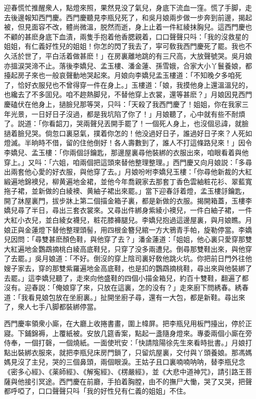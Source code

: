迎春慌忙推醒衆人，點燈來照，果然見没了氣兒，身底下流血一窪。慌了手脚，走去後邊報知西門慶。西門慶聽見李瓶兒死了，和吳月娘兩步做一步奔到前邊，揭起被，但見面容不改，體尚微溫，脱然而逝，身上止着一件紅綾抹胸兒。這西門慶也不顧的甚麽身底下血漬，兩隻手抱着他香腮親着，口口聲聲只呌：「我的沒救星的姐姐，有仁義好性兒的姐姐！你怎的閃了我去了，寜可敎我西門慶死了罷。我也不久活於世了，平白活着做甚麽！」在房裏離地跳的有三尺高，大放聲號哭。吳月娘亦搵涙哭渧不止。落後李嬌兒、孟玉樓、潘金蓮、孫雪娥，合家大小丫鬟養娘，都擡起房子來也一般哀聲動地哭起來。月娘向李嬌兒孟玉樓道：「不知晚夕多咱死了，恰好衣服兒也不曾得穿一件在身上。」玉樓道：「娘，我摸他身上還溫溫兒的，也纔去了不多囬兒。咱不趂熱脚兒，不替他穿上衣裳，還等甚麽？」月娘因見西門慶磕伏在他身上，撾臉兒那等哭，只呌：「天殺了我西門慶了！姐姐，你在我家三年光景，一日好日子沒過，都是我坑陷了你了！」月娘聽了，心中就有些不耐煩了。説道：「你看韶刀，哭兩聲兒丟開手罷了！一個死人身上，也沒個忌諱，就臉撾着臉兒哭。倘忽口裏惡氣，撲着你怎的！他没過好日子，誰過好日子來？人死如燈滅。半晌時不借，留的住他倒好！各人壽數到了，誰人不打這條路兒來！」因令李嬌兒、孟玉樓：「你兩個㧱鑰匙，那邊屋裏尋他裝綁的衣服出來，咱眼看着與他穿上。」又呌：「六姐，咱兩個把這頭來替他整理整理。」西門慶又向月娘説：「多尋出兩套他心愛的好衣服，與他穿了去。」月娘吩咐李嬌兒玉樓：「你尋他新裁的大紅緞遍地錦襖兒，柳黄遍地金裙，並他今年喬親家去那套丁香色雲紬粧花衫、翠藍寬拖子裙，並新做的白綾襖、黄紬子裙出來罷。」當下迎春㧱着燈，孟玉樓㧱鑰匙，開了牀屋裏門，拔步牀上第二個描金箱子裏，都是新做的衣服。揭開箱蓋，玉樓李嬌兒尋了半日，尋出三套衣裳來。又尋出件綁身紫綾小襖兒，一件白紬子裙，一件大紅小衣兒，並白綾女襪兒，粧花膝褲腿兒。李嬌兒抱過這邊屋裏，與月娘瞧。月娘正與金蓮燈下替他整理頭髻，用四根金簪兒綰一方大鴉青手帕，旋勒停當。李嬌兒因問：「尋雙甚麽顏色鞋，與他穿了去？」潘金蓮道：「姐姐，他心裏只愛穿那雙大紅遍地金鸚鵡摘桃白綾高底鞋兒，只穿了没多兩遭兒。倒尋那雙鞋出來，與他穿了去罷。」吳月娘道：「不好。倒沒的穿上陰司裏好敎他跳火坑。你把前日門外往他嫂子家去，穿的那雙紫羅遍地金高底鞋，也是扣的鸚鵡摘桃鞋，尋出來與他裝綁了去罷。」這李嬌兒聽了，走來向他盛鞋的四個小描金箱兒，約百十雙鞋，翻遍了都沒有。迎春説：「俺娘穿了來，只放在這裏，怎的没有？」走來廚下問綉春。綉春道：「我看見娘包放在坐廚裏。」扯開坐廚子尋，還有一大包，都是新鞋。尋出來了，衆人七手八脚都裝綁停當。

西門慶率領衆小廝，在大廳上收捲書畫，圍上幃屏。把李瓶兒用板門擡出，停於正寢。下鋪錦褥，上覆紙被。安放几筵香案，點起一盞隨身燈來。專委兩個小廝在旁侍奉，一個打磬，一個燒紙。一面使玳安：「快請陰陽徐先生來看時批書。」月娘打點出裝綁衣服來，就把李瓶兒床房門鎖了，只留炕屋裏，交付與丫頭養娘。那馮媽媽見沒了主兒，哭的三個鼻頭，兩個眼淚。王姑子且口裏喃喃呐呐，替李瓶兒念《密多心經》、《薬師經》、《解寃經》、《楞嚴經》，並《大悲中道神咒》，請引路王菩薩與他接引冥途。西門慶在前廳，手拍着胸膛，由不的撫尸大慟，哭了又哭，把聲都呼啞了，口口聲聲只呌「我的好性兒有仁義的姐姐」不住。

